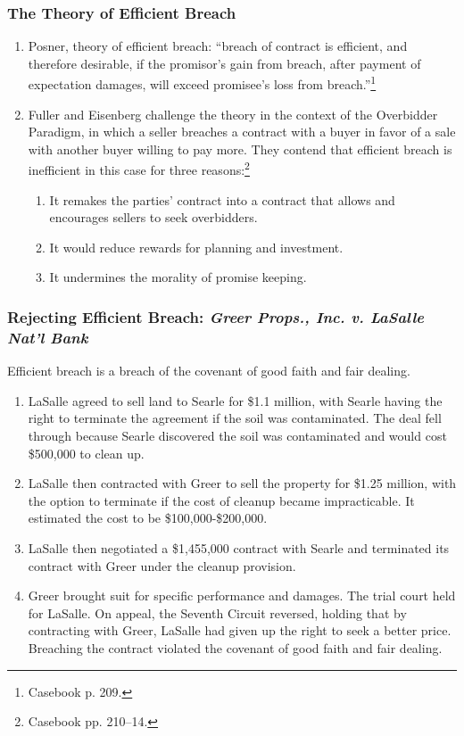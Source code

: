 \subsubsection{The Theory of Efficient Breach}

\begin{enumerate}
    \item Posner, theory of efficient breach: ``breach of contract is 
    efficient, and therefore desirable, if the promisor's gain from breach, 
    after payment of expectation damages, will exceed promisee's loss from 
    breach.''\footnote{Casebook p. 209.}
    \item Fuller and Eisenberg challenge the theory in the context of the 
    Overbidder Paradigm, in which a seller breaches a contract with a buyer in 
    favor of a sale with another buyer willing to pay more. They contend that 
    efficient breach is inefficient in this case for three 
    reasons:\footnote{Casebook pp. 210--14.}
    \begin{enumerate}
        \item It remakes the parties' contract into a contract that allows and 
        encourages sellers to seek overbidders.
        \item It would reduce rewards for planning and investment.
        \item It undermines the morality of promise keeping.
    \end{enumerate}
\end{enumerate}

\subsubsection{Rejecting Efficient Breach: \emph{Greer Props., Inc. v. LaSalle 
Nat'l Bank}}

Efficient breach is a breach of the covenant of good faith and fair dealing.

\begin{enumerate}
    \item LaSalle agreed to sell land to Searle for \$1.1 million, with Searle 
    having the right to terminate the agreement if the soil was contaminated. 
    The deal fell through because Searle discovered the soil was contaminated 
    and would cost \$500,000 to clean up.
    \item LaSalle then contracted with Greer to sell the property for \$1.25 
    million, with the option to terminate if the cost of cleanup became 
    impracticable. It estimated the cost to be \$100,000-\$200,000.
    \item LaSalle then negotiated a \$1,455,000 contract with Searle and 
    terminated its contract with Greer under the cleanup provision.
    \item Greer brought suit for specific performance and damages. The trial 
    court held for LaSalle. On appeal, the Seventh Circuit reversed, holding 
    that by contracting with Greer, LaSalle had given up the right to seek a 
    better price. Breaching the contract violated the covenant of good faith 
    and fair dealing.
\end{enumerate}

